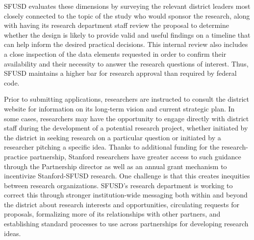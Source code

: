\documentclass[
]{WileySix}
\begin{document}
SFUSD evaluates these dimensions by surveying the relevant district leaders most closely connected to the topic of the study who would sponsor the research, along with having its research department staff review the proposal to determine whether the design is likely to provide valid and useful findings on a timeline that can help inform the desired practical decisions. This internal review also includes a close inspection of the data elements requested in order to confirm their availability and their necessity to answer the research questions of interest. Thus, SFUSD maintains a higher bar for research approval than required by federal code.

Prior to submitting applications, researchers are instructed to consult the district website for information on its long-term vision and current strategic plan. In some cases, researchers may have the opportunity to engage directly with district staff during the development of a potential research project, whether initiated by the district in seeking research on a particular question or initiated by a researcher pitching a specific idea. Thanks to additional funding for the research-practice partnership, Stanford researchers have greater access to such guidance through the Partnership director as well as an annual grant mechanism to incentivize Stanford-SFUSD research. One challenge is that this creates inequities between research organizations. SFUSD's research department is working to correct this through stronger institution-wide messaging both within and beyond the district about research interests and opportunities, circulating requests for proposals, formalizing more of its relationships with other partners, and establishing standard processes to use across partnerships for developing research ideas.
\end{document}
